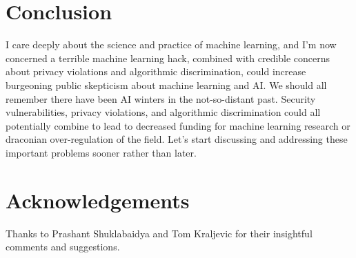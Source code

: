 \documentclass[fleqn]{article}
\begin{document}
\section*{Conclusion}

I care deeply about the science and practice of machine learning, and I'm now concerned a terrible machine learning hack, combined with credible concerns about privacy violations and algorithmic discrimination, could increase burgeoning public skepticism about machine learning and AI. We should all remember there have been AI winters in the not-so-distant past. Security vulnerabilities, privacy violations, and algorithmic discrimination could all potentially combine to lead to decreased funding for machine learning research or draconian over-regulation of the field. Let's start discussing and addressing these important problems sooner rather than later.

\section*{Acknowledgements}

Thanks to Prashant Shuklabaidya and Tom Kraljevic for their insightful comments and suggestions.
\end{document}

